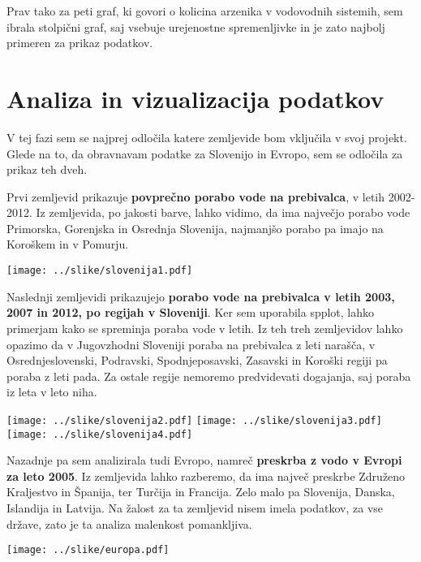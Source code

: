 \documentclass[11pt,a4paper]{article}
\begin{document}
Prav tako za peti graf, ki govori o kolicina arzenika v vodovodnih sistemih, sem ibrala stolpični graf, saj vsebuje urejenostne spremenljivke in je zato najbolj primeren za prikaz podatkov.



\section{Analiza in vizualizacija podatkov}

V tej fazi sem se najprej odločila katere zemljevide bom vključila v svoj projekt. Glede na to, da obravnavam podatke za Slovenijo in Evropo, sem se odločila za prikaz teh dveh.
\vspace{5mm} 

Prvi zemljevid prikazuje \textbf{povprečno porabo vode na prebivalca}, v letih 2002-2012. Iz zemljevida, po jakosti barve, lahko vidimo, da ima največjo porabo vode Primorska, Gorenjska in Osrednja Slovenija, najmanjšo porabo pa imajo na Koroškem in v Pomurju.

\texttt{[image: ../slike/slovenija1.pdf]}

\newpage
Naslednji zemljevidi prikazujejo \textbf{porabo vode na prebivalca v letih 2003, 2007 in 2012, po regijah v Sloveniji}. Ker sem uporabila spplot, lahko primerjam kako se spreminja poraba vode v letih. Iz teh treh zemljevidov lahko opazimo da v Jugovzhodni Sloveniji poraba na prebivalca z leti narašča, v Osrednjeslovenski, Podravski, Spodnjeposavski, Zasavski in Koroški regiji pa poraba z leti pada. Za ostale regije nemoremo predvidevati dogajanja, saj poraba iz leta v leto niha. 


\texttt{[image: ../slike/slovenija2.pdf]}
\vspace{5mm} 
\texttt{[image: ../slike/slovenija3.pdf]}
\vspace{5mm} 
\texttt{[image: ../slike/slovenija4.pdf]}

\newpage
Nazadnje pa sem analizirala tudi Evropo, namreč \textbf{preskrba z vodo v Evropi za leto 2005}. Iz zemljevida lahko razberemo, da ima največ preskrbe Združeno Kraljestvo in Španija, ter Turčija in Francija. Zelo malo pa Slovenija, Danska, Islandija in Latvija. Na žalost za ta zemljevid nisem imela podatkov, za vse države, zato je ta analiza malenkost pomankljiva.

\texttt{[image: ../slike/europa.pdf]}


% 
% 




% 
% 
\end{document}
